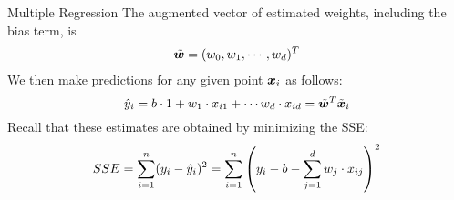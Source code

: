 \begin{frame}{Multiple Regression}
%
%
%
The augmented vector of estimated weights, including the bias term, is 
\begin{align*}
    \tilde{{\boldsymbol w}} = (w_0, w_1, \cdots, w_d)^T 
\end{align*}
We then make predictions for
any given point ${\boldsymbol x}_i$ as follows:
\begin{equation*}
    \hat{y}_i = b \cdot 1 + w_1 \cdot x_{i1} + \cdots w_d \cdot x_{id}
    = \tilde{{\boldsymbol w}}^T\tilde{{\boldsymbol x}}_i
\end{equation*}
Recall that these estimates are obtained
by minimizing the %
SSE:
\begin{align*}
    SSE = \sum_{i=1}^n (y_i - \hat{y}_i)^2 
    = \sum^{n}_{i=1} \left(y_i - b - \sum_{j=1}^d w_j \cdot x_{ij}\right)^2 
\end{align*}
\end{frame}

